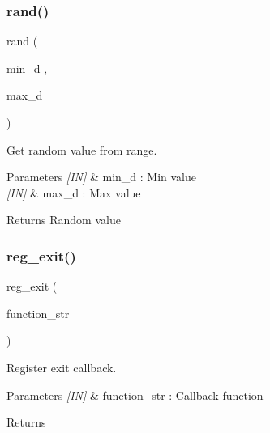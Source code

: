 \subsubsection{rand()\hspace{0.1cm}{\footnotesize\ttfamily [2/2]}}
{\footnotesize\ttfamily rand (\begin{DoxyParamCaption}\item[{min\+\_\+d}]{,  }\item[{max\+\_\+d}]{ }\end{DoxyParamCaption})}



Get random value from range. 


\begin{DoxyCode}{0}
\end{DoxyCode}



\begin{DoxyParams}{Parameters}
{\em \mbox{[}\+I\+N\mbox{]}} & min\+\_\+d \+: Min value \\
\hline
{\em \mbox{[}\+I\+N\mbox{]}} & max\+\_\+d \+: Max value \\
\hline
\end{DoxyParams}
\begin{DoxyReturn}{Returns}
Random value 
\end{DoxyReturn}
\mbox{\label{group___public__function_gaeae0d4679222aee0bdd5c8099816b119}} 
\subsubsection{reg\_exit()}
{\footnotesize\ttfamily reg\+\_\+exit (\begin{DoxyParamCaption}\item[{function\+\_\+str}]{ }\end{DoxyParamCaption})}



Register exit callback. 


\begin{DoxyCode}{0}
\DoxyCodeLine{\{}
\DoxyCodeLine{\}}
\end{DoxyCode}



\begin{DoxyParams}{Parameters}
{\em \mbox{[}\+I\+N\mbox{]}} & function\+\_\+str \+: Callback function \\
\hline
\end{DoxyParams}
\begin{DoxyReturn}{Returns}

\end{DoxyReturn}
